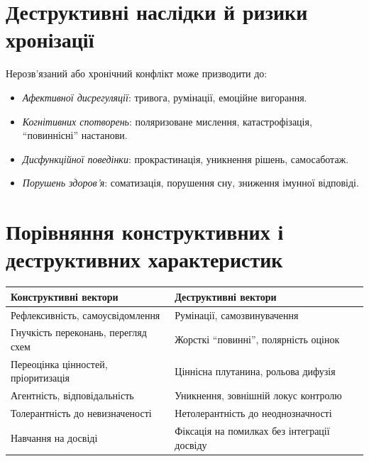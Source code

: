 \documentclass[12pt,a4paper]{article}
\begin{document}
\section{Деструктивні наслідки й ризики хронізації}
\label{sec:destructive}
Нерозв'язаний або хронічний конфлікт може призводити до:
\begin{itemize}[left=6mm]
    \item \emph{Афективної дисрегуляції}: тривога, румінації, емоційне вигорання.
    \item \emph{Когнітивних спотворень}: поляризоване мислення, катастрофізація, \enquote{повиннісні} настанови.
    \item \emph{Дисфункційної поведінки}: прокрастинація, уникнення рішень, самосаботаж.
    \item \emph{Порушень здоров'я}: соматизація, порушення сну, зниження імунної відповіді.
\end{itemize}

\section{Порівняння конструктивних і деструктивних характеристик}
\begin{table}[h!]
\centering
\renewcommand{\arraystretch}{1.2}
\begin{tabular}{p{} p{}}
\toprule
\textbf{Конструктивні вектори} & \textbf{Деструктивні вектори} \\
\midrule
Рефлексивність, самоусвідомлення & Румінації, самозвинувачення \\
Гнучкість переконань, перегляд схем & Жорсткі \enquote{повинні}, полярність оцінок \\
Переоцінка цінностей, пріоритизація & Ціннісна плутанина, рольова дифузія \\
Агентність, відповідальність & Уникнення, зовнішній локус контролю \\
Толерантність до невизначеності & Нетолерантність до неоднозначності \\
Навчання на досвіді & Фіксація на помилках без інтеграції досвіду \\
\bottomrule
\end{tabular}
\end{table}

\end{document}
